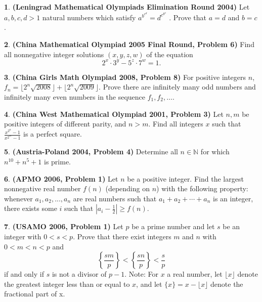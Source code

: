 \documentclass{article}
\newcommand{\plus}{+}
\newcommand{\minus}{-}
\newcommand{\equal}{=}
\theoremstyle{definition}
\newtheorem{p}{}
\begin{document}
\begin{p}{\bf (Leningrad Mathematical Olympiads Elimination Round 2004)}
Let $a,b,c,d > 1$ natural numbers which satisfy $a^{b^{c^d}}=d^{c^{b^a}}$ . Prove that $a = d$ and $b=c$.
\end{p}



\begin{p}{\bf (China Mathematical Olympiad 2005 Final Round, Problem 6)}
Find all nonnegative integer solutions $(x,y,z,w)$ of the equation\[2^x\cdot3^y-5^z\cdot7^w=1.\]
\end{p}



\begin{p}{\bf (China Girls Math Olympiad 2008, Problem 8)}
For positive integers $ n$, $ f_n \equal{} \lfloor2^n\sqrt {2008}\rfloor \plus{} \lfloor2^n\sqrt {2009}\rfloor$. Prove there are infinitely many odd numbers and infinitely many even numbers in the sequence $ f_1,f_2,\ldots$.
\end{p}




\begin{p}{\bf (China West Mathematical Olympiad 2001, Problem 3)}
Let $ n, m$ be positive integers of different parity, and $ n > m$.  Find all integers $ x$ such that $ \frac {x^{2^n} \minus{} 1}{x^{2^m} \minus{} 1}$ is a perfect square.
\end{p}




\begin{p}{\bf (Austria-Poland 2004, Problem 4)}
Determine all $n \in \mathbb{N}$ for which $n^{10} + n^5 + 1$ is prime.
\end{p}






\begin{p}{\bf (APMO 2006, Problem 1)}
Let $n$ be a positive integer. Find the largest nonnegative real number $f(n)$ (depending on $n$) with the following property: whenever $a_1,a_2,...,a_n$ are real numbers such that $a_1+a_2+\cdots +a_n$ is an integer, there exists some $i$ such that  $\left|a_i-\frac{1}{2}\right|\ge f(n)$.
\end{p}





\begin{p}{\bf (USAMO 2006, Problem 1)}
Let $p$ be a prime number and let $s$ be an integer with $0 < s < p.$ Prove that there exist integers $m$ and $n$ with $0 < m < n < p$ and
\[ \left \{\frac{sm}{p} \right\} < \left \{\frac{sn}{p} \right \} < \frac{s}{p}  \]
if and only if $s$ is not a divisor of $p-1$.
\newline
Note: For $x$ a real number, let $\lfloor x \rfloor$ denote the greatest integer less than or equal to $x$, and let $\{x\} = x - \lfloor x \rfloor$ denote the fractional part of x.
\end{p}
\end{document}

